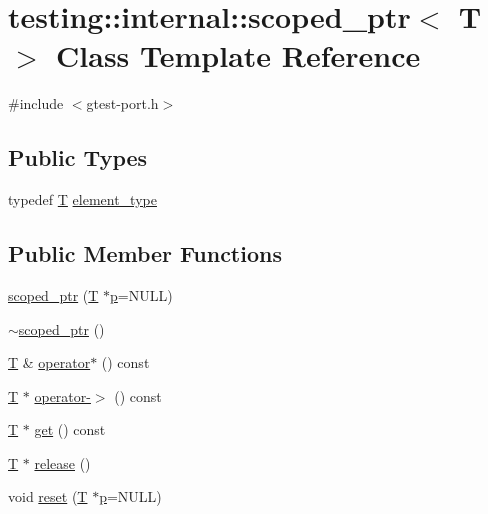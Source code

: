 \hypertarget{classtesting_1_1internal_1_1scoped__ptr}{}\section{testing\+:\+:internal\+:\+:scoped\+\_\+ptr$<$ T $>$ Class Template Reference}
\label{classtesting_1_1internal_1_1scoped__ptr}


{\ttfamily \#include $<$gtest-\/port.\+h$>$}

\subsection*{Public Types}
\begin{DoxyCompactItemize}
\item 
typedef \hyperlink{functions__7_8js_adf1f3edb9115acb0a1e04209b7a9937b}{T} \hyperlink{classtesting_1_1internal_1_1scoped__ptr_ae755ffeebada8e20b68c1d1ffa91cf13}{element\+\_\+type}
\end{DoxyCompactItemize}
\subsection*{Public Member Functions}
\begin{DoxyCompactItemize}
\item 
\hyperlink{classtesting_1_1internal_1_1scoped__ptr_adb972432999a0c63720df148964ac2a5}{scoped\+\_\+ptr} (\hyperlink{functions__7_8js_adf1f3edb9115acb0a1e04209b7a9937b}{T} $\ast$\hyperlink{jquery_8js_a2335e57f79b6acfb6de59c235dc8a83e}{p}=N\+U\+LL)
\item 
\hyperlink{classtesting_1_1internal_1_1scoped__ptr_ab721de9bf4369f002fb563e82352ee36}{$\sim$scoped\+\_\+ptr} ()
\item 
\hyperlink{functions__7_8js_adf1f3edb9115acb0a1e04209b7a9937b}{T} \& \hyperlink{classtesting_1_1internal_1_1scoped__ptr_ab197837f87062de69d9d6e04539bbabe}{operator$\ast$} () const 
\item 
\hyperlink{functions__7_8js_adf1f3edb9115acb0a1e04209b7a9937b}{T} $\ast$ \hyperlink{classtesting_1_1internal_1_1scoped__ptr_adc38310fbbe400faf9279e36000a17c4}{operator-\/$>$} () const 
\item 
\hyperlink{functions__7_8js_adf1f3edb9115acb0a1e04209b7a9937b}{T} $\ast$ \hyperlink{classtesting_1_1internal_1_1scoped__ptr_adc8f8fcb63ce69f80f011456e6d2f08d}{get} () const 
\item 
\hyperlink{functions__7_8js_adf1f3edb9115acb0a1e04209b7a9937b}{T} $\ast$ \hyperlink{classtesting_1_1internal_1_1scoped__ptr_a7a4f3e568d81a5d8bcb5f8d6bf5130b1}{release} ()
\item 
void \hyperlink{classtesting_1_1internal_1_1scoped__ptr_acac03266a43359801aff0de5c990bec0}{reset} (\hyperlink{functions__7_8js_adf1f3edb9115acb0a1e04209b7a9937b}{T} $\ast$\hyperlink{jquery_8js_a2335e57f79b6acfb6de59c235dc8a83e}{p}=N\+U\+LL)
\end{DoxyCompactItemize}
